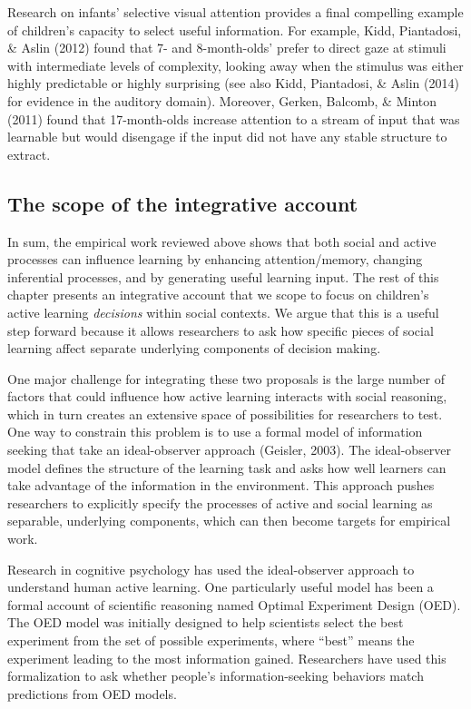 \documentclass[oneside]{report}
\begin{document}
Research on infants' selective visual attention provides a final
compelling example of children's capacity to select useful information.
For example, Kidd, Piantadosi, \& Aslin (2012) found that 7- and
8-month-olds' prefer to direct gaze at stimuli with intermediate levels
of complexity, looking away when the stimulus was either highly
predictable or highly surprising (see also Kidd, Piantadosi, \& Aslin
(2014) for evidence in the auditory domain). Moreover, Gerken, Balcomb,
\& Minton (2011) found that 17-month-olds increase attention to a stream
of input that was learnable but would disengage if the input did not
have any stable structure to extract.

\subsection{The scope of the integrative
account}\label{the-scope-of-the-integrative-account}

In sum, the empirical work reviewed above shows that both social and
active processes can influence learning by enhancing attention/memory,
changing inferential processes, and by generating useful learning input.
The rest of this chapter presents an integrative account that we scope
to focus on children's active learning \emph{decisions} within social
contexts. We argue that this is a useful step forward because it allows
researchers to ask how specific pieces of social learning affect
separate underlying components of decision making.

One major challenge for integrating these two proposals is the large
number of factors that could influence how active learning interacts
with social reasoning, which in turn creates an extensive space of
possibilities for researchers to test. One way to constrain this problem
is to use a formal model of information seeking that take an
ideal-observer approach (Geisler, 2003). The ideal-observer model
defines the structure of the learning task and asks how well learners
can take advantage of the information in the environment. This approach
pushes researchers to explicitly specify the processes of active and
social learning as separable, underlying components, which can then
become targets for empirical work.

Research in cognitive psychology has used the ideal-observer approach to
understand human active learning. One particularly useful model has been
a formal account of scientific reasoning named Optimal Experiment Design
(OED). The OED model was initially designed to help scientists select
the best experiment from the set of possible experiments, where ``best''
means the experiment leading to the most information gained. Researchers
have used this formalization to ask whether people's information-seeking
behaviors match predictions from OED models.
\end{document}
